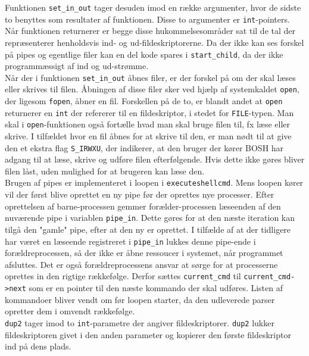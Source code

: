 Funktionen \texttt{set\_in\_out} tager desuden imod en række argumenter, hvor de sidste to benyttes som resultater af funktionen. Disse to argumenter er \texttt{int}-pointers. Når funktionen returnerer er begge disse hukommelsesområder sat til de tal der repræsenterer henholdsvis ind- og ud-fildeskriptorerne. Da der ikke kan ses forskel på pipes og egentlige filer kan en del kode spares i \texttt{start\_child}, da der ikke programmæssigt af ind og ud-strømme.\\

Når der i funktionen \texttt{set\_in\_out} åbnes filer, er der forskel på om der skal læses eller skrives til filen. Åbningen af disse filer sker ved hjælp af systemkaldet \texttt{open}, der ligesom \texttt{fopen}, åbner en fil. Forskellen på de to, er blandt andet at \texttt{open} returnerer en \texttt{int} der refererer til en fildeskriptor, i stedet for \texttt{FILE}-typen. Man skal i \texttt{open}-funktionen også fortælle hvad man skal bruge filen til, fx læse eller skrive. I tilfældet hvor en fil åbnes for at skrive til den, er man nødt til at give den et ekstra flag \texttt{S\_IRWXU}, der indikerer, at den bruger der kører BOSH har adgang til at læse, skrive og udføre filen efterfølgende. Hvis dette ikke gøres bliver filen låst, uden mulighed for at brugeren kan læse den.\\

Brugen af pipes er implementeret i loopen i \texttt{executeshellcmd}. Mens loopen kører vil der først blive oprettet en ny pipe før der oprettes nye processer. Efter oprettelsen af barne-processen gemmer forælder-processen læseenden af den nuværende pipe i variablen \texttt{pipe\_in}. Dette gøres for at den næste iteration kan tilgå den "gamle" pipe, efter at den ny er oprettet. I tilfælde af at der tidligere har været en læseende registreret i \texttt{pipe\_in} lukkes denne pipe-ende i forældreprocessen, så der ikke er åbne ressoucer i systemet, når programmet afsluttes. Det er også forældreprocessens ansvar at sørge for at processerne oprettes in den rigtige rækkefølge. Derfor sættes \texttt{current\_cmd} til \texttt{current\_cmd->next} som er en pointer til den næste kommando der skal udføres. Listen af kommandoer bliver vendt om før loopen starter, da den udleverede parser opretter dem i omvendt rækkefølge.\\

\texttt{dup2} tager imod to \texttt{int}-parametre der angiver fildeskriptorer. \texttt{dup2} lukker fildeskriptoren givet i den anden parameter og kopierer den første fildeskriptor ind på dens plads.\\

